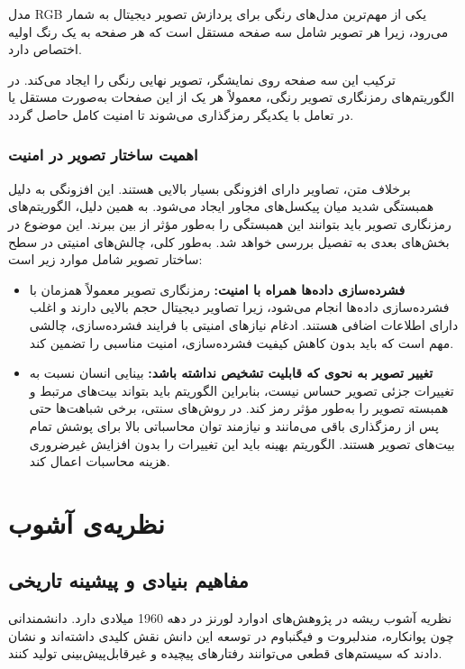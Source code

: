 \documentclass[a4paper,12pt]{report}
\renewcommand{\%}{\lr{\oldpercent}}
\providecommand{\lr}[1]{#1}
\begin{document}
مدل \lr{RGB} یکی از مهم‌ترین مدل‌های رنگی برای پردازش تصویر دیجیتال به شمار می‌رود، زیرا هر تصویر شامل سه صفحه مستقل است که هر صفحه به یک رنگ اولیه اختصاص دارد.

ترکیب این سه صفحه روی نمایشگر، تصویر نهایی رنگی را ایجاد می‌کند. در الگوریتم‌های رمزنگاری تصویر رنگی، معمولاً هر یک از این صفحات به‌صورت مستقل یا در تعامل با یکدیگر رمزگذاری می‌شوند تا امنیت کامل حاصل گردد.

\subsubsection{اهمیت ساختار تصویر در امنیت}
برخلاف متن، تصاویر دارای افزونگی بسیار بالایی هستند. این افزونگی به دلیل همبستگی شدید میان پیکسل‌های مجاور ایجاد می‌شود. به همین دلیل، الگوریتم‌های رمزنگاری تصویر باید بتوانند این همبستگی را به‌طور مؤثر از بین ببرند. این موضوع در بخش‌های بعدی به تفصیل بررسی خواهد شد. به‌طور کلی، چالش‌های امنیتی در سطح ساختار تصویر شامل موارد زیر است:
\begin{itemize}
    \item \textbf{فشرده‌سازی داده‌ها همراه با امنیت:} رمزنگاری تصویر معمولاً همزمان با فشرده‌سازی داده‌ها انجام می‌شود، زیرا تصاویر دیجیتال حجم بالایی دارند و اغلب دارای اطلاعات اضافی هستند\cite{ref54}. ادغام نیازهای امنیتی با فرایند فشرده‌سازی، چالشی مهم است که باید بدون کاهش کیفیت فشرده‌سازی، امنیت مناسبی را تضمین کند.
    \item \textbf{تغییر تصویر به نحوی که قابلیت تشخیص نداشته باشد:} بینایی انسان نسبت به تغییرات جزئی تصویر حساس نیست، بنابراین الگوریتم باید بتواند بیت‌های مرتبط و همبسته تصویر را به‌طور مؤثر رمز کند\cite{ref55}. در روش‌های سنتی، برخی شباهت‌ها حتی پس از رمزگذاری باقی می‌مانند و نیازمند توان محاسباتی بالا برای پوشش تمام بیت‌های تصویر هستند. الگوریتم بهینه باید این تغییرات را بدون افزایش غیرضروری هزینه محاسبات اعمال کند.
\end{itemize}

\section{نظریه‌ی آشوب}
\subsection{مفاهیم بنیادی و پیشینه تاریخی} \label{sec:chaos_history}
نظریه آشوب ریشه در پژوهش‌های ادوارد لورنز در دهه 1960 میلادی دارد. دانشمندانی چون پوانکاره، مندلبروت و فیگنباوم در توسعه این دانش نقش کلیدی داشته‌اند و نشان دادند که سیستم‌های قطعی می‌توانند رفتارهای پیچیده و غیرقابل‌پیش‌بینی تولید کنند.
\end{document}
